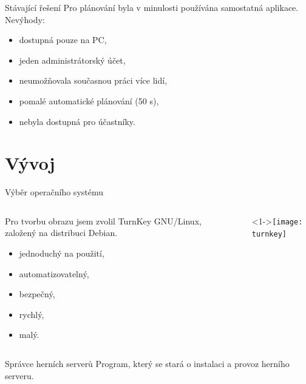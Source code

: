 \documentclass[czech,aspectratio=169]{beamer}
\begin{document}
  \begin{frame}{Stávající řešení}
    Pro plánování byla v minulosti používána samostatná aplikace. Nevýhody:
    \begin{itemize}
      \item dostupná pouze na PC,
      \item jeden administrátorský účet,
      \item neumožňovala současnou práci více lidí,
      \item pomalé automatické plánování (50 s),
      \item nebyla dostupná pro účastníky.
    \end{itemize}
  \end{frame}

  \section{Vývoj}
  \begin{frame}{Výběr operačního systému}
    \begin{columns}
      \begin{column}{.6\textwidth}
        Pro tvorbu obrazu jsem zvolil TurnKey GNU/Linux, založený na distribuci Debian.
        \begin{itemize}
          \item<2-> jednoduchý na použití,
          \item<3-> automatizovatelný,
          \item<4-> bezpečný,
          \item<5-> rychlý,
          \item<6-> malý.
        \end{itemize}
      \end{column}
      \begin{column}{.3\textwidth}
        \begin{itemize}
          \item[]<1->{\texttt{[image: turnkey]}}
        \end{itemize}
      \end{column}
    \end{columns}
  \end{frame}

  \begin{frame}{Správce herních serverů}
    Program, který se stará o instalaci a provoz herního serveru.
  \end{frame}
\end{document}
